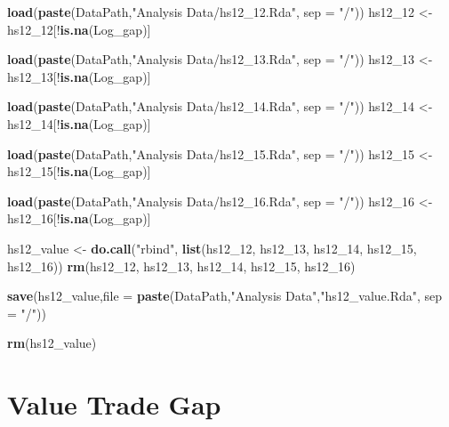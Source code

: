 \documentclass[10pt,]{article}
\newenvironment{Shaded}{\begin{snugshade}}{\end{snugshade}}
\newcommand{\KeywordTok}[1]{\textcolor[rgb]{0.13,0.29,0.53}{\textbf{{#1}}}}
\newcommand{\DataTypeTok}[1]{\textcolor[rgb]{0.13,0.29,0.53}{{#1}}}
\newcommand{\StringTok}[1]{\textcolor[rgb]{0.31,0.60,0.02}{{#1}}}
\newcommand{\NormalTok}[1]{{#1}}
\begin{document}
\begin{Shaded}
\begin{Highlighting}[]
\KeywordTok{load}\NormalTok{(}\KeywordTok{paste}\NormalTok{(DataPath,}\StringTok{"Analysis Data/hs12_12.Rda"}\NormalTok{, }\DataTypeTok{sep =} \StringTok{"/"}\NormalTok{))}
\NormalTok{hs12_12 <-}\StringTok{ }\NormalTok{hs12_12[!}\KeywordTok{is.na}\NormalTok{(Log_gap)]}

\KeywordTok{load}\NormalTok{(}\KeywordTok{paste}\NormalTok{(DataPath,}\StringTok{"Analysis Data/hs12_13.Rda"}\NormalTok{, }\DataTypeTok{sep =} \StringTok{"/"}\NormalTok{))}
\NormalTok{hs12_13 <-}\StringTok{ }\NormalTok{hs12_13[!}\KeywordTok{is.na}\NormalTok{(Log_gap)]}

\KeywordTok{load}\NormalTok{(}\KeywordTok{paste}\NormalTok{(DataPath,}\StringTok{"Analysis Data/hs12_14.Rda"}\NormalTok{, }\DataTypeTok{sep =} \StringTok{"/"}\NormalTok{))}
\NormalTok{hs12_14 <-}\StringTok{ }\NormalTok{hs12_14[!}\KeywordTok{is.na}\NormalTok{(Log_gap)]}

\KeywordTok{load}\NormalTok{(}\KeywordTok{paste}\NormalTok{(DataPath,}\StringTok{"Analysis Data/hs12_15.Rda"}\NormalTok{, }\DataTypeTok{sep =} \StringTok{"/"}\NormalTok{))}
\NormalTok{hs12_15 <-}\StringTok{ }\NormalTok{hs12_15[!}\KeywordTok{is.na}\NormalTok{(Log_gap)]}

\KeywordTok{load}\NormalTok{(}\KeywordTok{paste}\NormalTok{(DataPath,}\StringTok{"Analysis Data/hs12_16.Rda"}\NormalTok{, }\DataTypeTok{sep =} \StringTok{"/"}\NormalTok{))}
\NormalTok{hs12_16 <-}\StringTok{ }\NormalTok{hs12_16[!}\KeywordTok{is.na}\NormalTok{(Log_gap)]}

\NormalTok{hs12_value <-}\StringTok{ }\KeywordTok{do.call}\NormalTok{(}\StringTok{"rbind"}\NormalTok{, }\KeywordTok{list}\NormalTok{(hs12_12, hs12_13, hs12_14, hs12_15, hs12_16))}
\KeywordTok{rm}\NormalTok{(hs12_12, hs12_13, hs12_14, hs12_15, hs12_16)}

\KeywordTok{save}\NormalTok{(hs12_value,}\DataTypeTok{file =} \KeywordTok{paste}\NormalTok{(DataPath,}\StringTok{"Analysis Data"}\NormalTok{,}\StringTok{"hs12_value.Rda"}\NormalTok{, }\DataTypeTok{sep =} \StringTok{"/"}\NormalTok{))}

\KeywordTok{rm}\NormalTok{(hs12_value)}
\end{Highlighting}
\end{Shaded}

\section{Value Trade Gap}\label{value-trade-gap}
\end{document}
